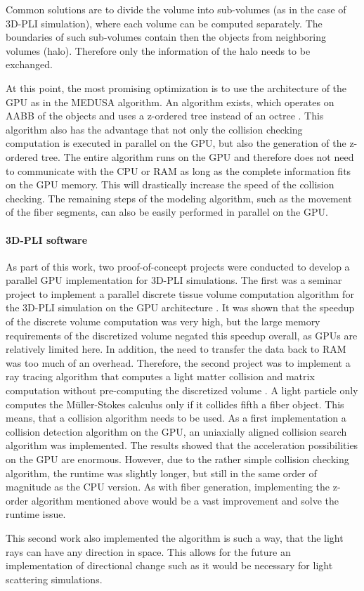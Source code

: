 Common solutions are to divide the volume into sub-volumes (as in the case of \ac{3D-PLI} simulation), where each volume can be computed separately.
The boundaries of such sub-volumes contain then the objects from neighboring volumes (halo).
Therefore only the information of the halo needs to be exchanged.
\par
% 
At this point, the most promising optimization is to use the architecture of the \ac{GPU} as \eg{} in the \ac{MEDUSA} algorithm.
An algorithm exists, which operates on \ac{AABB} of the objects and uses a z-ordered tree instead of an octree \cite{Karras2012}.
This algorithm also has the advantage that not only the collision checking computation is executed in parallel on the \ac{GPU}, but also the generation of the z-ordered tree.
The entire algorithm runs on the \ac{GPU} and therefore does not need to communicate with the \ac{CPU} or \ac{RAM} as long as the complete information fits on the \ac{GPU} memory.
This will drastically increase the speed of the collision checking.
The remaining steps of the modeling algorithm, such as the movement of the fiber segments, can also be easily performed in parallel on the \ac{GPU}.
% 
% 
% 
\paragraph{\ac{3D-PLI} software}
% 
As part of this work, two proof-of-concept projects were conducted to develop a parallel GPU implementation for \ac{3D-PLI} simulations.
The first was a seminar project to implement a parallel discrete tissue volume computation algorithm for the \ac{3D-PLI} simulation on the \ac{GPU} architecture \cite{Kobusch:Seminar}.
It was shown that the speedup of the discrete volume computation was very high, but the large memory requirements of the discretized volume negated this speedup overall, as \acp{GPU} are relatively limited here.
In addition, the need to transfer the data back to \ac{RAM} was too much of an overhead.
Therefore, the second project was to implement a ray tracing algorithm that computes a light matter collision and matrix computation without pre-computing the discretized volume \cite{Kobusch:887783, GPUfastpli}.
A light particle only computes the M{\"u}ller-Stokes calculus only if it collides fifth a fiber object.
This means, that a collision algorithm needs to be used.
As a first implementation a collision detection algorithm on the \ac{GPU}, an uniaxially aligned collision search algorithm \cite{Karras2012} was implemented.
The results showed that the acceleration possibilities on the \ac{GPU} are enormous.
However, due to the rather simple collision checking algorithm, the runtime was slightly longer, but still in the same order of magnitude as the \ac{CPU} version.
As with fiber generation, implementing the z-order algorithm mentioned above \cite{Karras2012} would be a vast improvement and solve the runtime issue.
%
\par
This second work also implemented the algorithm is such a way, that the light rays can have any direction in space.
This allows for the future an implementation of directional change such as it would be necessary for light scattering simulations.
% 
% 
% 
